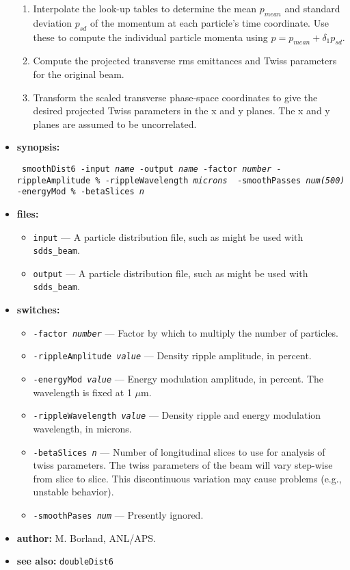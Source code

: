 \documentclass[11pt]{article}
\begin{document}
\begin{itemize}
\begin{enumerate}
\item Interpolate the look-up tables to determine the mean $p_{mean}$ and standard 
 deviation $p_{sd}$ of the momentum at each particle's time coordinate. Use these
 to compute the individual particle momenta using $p = p_{mean} + \delta_1 p_{sd}$.
\item Compute the projected transverse rms emittances and Twiss parameters for the original beam.
\item Transform the scaled transverse phase-space coordinates to give the desired 
 projected Twiss parameters in the x and y planes.  The x and y planes are assumed to be uncorrelated.
\end{enumerate}

\item {\bf synopsis:}
\begin{flushleft}{\tt
smoothDist6 -input {\em name} -output {\em name} -factor {\em number} -rippleAmplitude {\em \%} -rippleWavelength {\em microns} \
 -smoothPasses {\em num(500)} -energyMod {\em \%} -betaSlices {\em n}
}\end{flushleft}

\item {\bf files:}
\begin{itemize}
\item {\tt input} --- A particle distribution file, such as might be used with \verb|sdds_beam|.
\item {\tt output} --- A particle distribution file, such as might be used with \verb|sdds_beam|.
\end{itemize}

\item {\bf switches:}
\begin{itemize}
\item {\tt -factor {\em number}} --- Factor by which to multiply the number of particles.
\item {\tt -rippleAmplitude {\em value}} --- Density ripple amplitude, in percent.
\item {\tt -energyMod {\em value}} --- Energy modulation amplitude, in percent.  The wavelength is fixed at 1 $\mu$m.
\item {\tt -rippleWavelength {\em value}} --- Density ripple and energy modulation wavelength, in microns.
\item {\tt -betaSlices {\em n}} --- Number of longitudinal slices to use for analysis of twiss parameters.  The twiss parameters of 
the beam will vary step-wise from slice to slice.  This discontinuous variation may cause problems (e.g., unstable behavior).
\item {\tt -smoothPases {\em num}} --- Presently ignored.
\end{itemize}

\item {\bf author:} M. Borland, ANL/APS.

\item {\bf see also:} {\tt doubleDist6}
\end{itemize}
\end{document}
